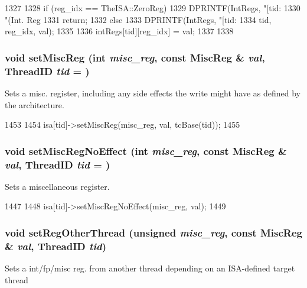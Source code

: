 \begin{DoxyCode}
1327 {
1328     if (reg_idx == TheISA::ZeroReg) {
1329         DPRINTF(IntRegs, "[tid:%
1330                 "(Int. Reg %
1331         return;
1332     } else {
1333         DPRINTF(IntRegs, "[tid:%
1334                 tid, reg_idx, val);
1335 
1336         intRegs[tid][reg_idx] = val;
1337     }
1338 }
\end{DoxyCode}
\hypertarget{classInOrderCPU_a9b618db833e56fbb32246fe25716846f}{
\subsubsection[{setMiscReg}]{\setlength{\rightskip}{0pt plus 5cm}void setMiscReg (int {\em misc\_\-reg}, \/  const {\bf MiscReg} \& {\em val}, \/  {\bf ThreadID} {\em tid} = {})}}
\label{classInOrderCPU_a9b618db833e56fbb32246fe25716846f}
Sets a misc. register, including any side effects the write might have as defined by the architecture. 


\begin{DoxyCode}
1453 {
1454     isa[tid]->setMiscReg(misc_reg, val, tcBase(tid));
1455 }
\end{DoxyCode}
\hypertarget{classInOrderCPU_ab8dd4afdd4e652ca191b235505691f68}{
\subsubsection[{setMiscRegNoEffect}]{\setlength{\rightskip}{0pt plus 5cm}void setMiscRegNoEffect (int {\em misc\_\-reg}, \/  const {\bf MiscReg} \& {\em val}, \/  {\bf ThreadID} {\em tid} = {})}}
\label{classInOrderCPU_ab8dd4afdd4e652ca191b235505691f68}
Sets a miscellaneous register. 


\begin{DoxyCode}
1447 {
1448     isa[tid]->setMiscRegNoEffect(misc_reg, val);
1449 }
\end{DoxyCode}
\hypertarget{classInOrderCPU_aeefa734eaa86cd9ffcbd59f4554b32a2}{
\subsubsection[{setRegOtherThread}]{\setlength{\rightskip}{0pt plus 5cm}void setRegOtherThread (unsigned {\em misc\_\-reg}, \/  const {\bf MiscReg} \& {\em val}, \/  {\bf ThreadID} {\em tid})}}
\label{classInOrderCPU_aeefa734eaa86cd9ffcbd59f4554b32a2}
Sets a int/fp/misc reg. from another thread depending on an ISA-\/defined target thread 


